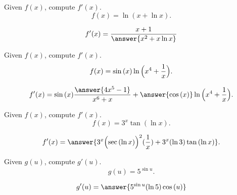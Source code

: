 \documentclass{ximera}
\author{Nela Lakos}
\begin{document}
\begin{exercise}
Given $f(x)$, compute $f'(x)$.
\[
f(x) = \ln{(x+\ln{x})}.
\]
\begin{prompt}
\[
f'(x) =\dfrac{x+1}{ \answer{x^2 +x\ln{x}}}
\]
\end{prompt}
\end{exercise}
\begin{exercise}
Given $f(x)$, compute $f'(x)$.
\[
f(x) = \sin{(x)}\ln{\Bigl(x^4+\frac{1}{x}\Bigr)}.
\]
\begin{prompt}
\[
f'(x) = \sin{(x)}\dfrac{\answer{4x^5-1}}{{x^6+x}}+\answer{ \cos{(x)}}\ln{\Bigl(x^4+\frac{1}{x}\Bigr)}.
\]
\end{prompt}
\end{exercise}
\begin{exercise}
Given $f(x)$, compute $f'(x)$.
\[
f(x) = 3^{x}\tan{(\ln{x})}.
\]
\begin{prompt}
\[
f'(x) =\answer{3^{x}\Bigl(\sec{(\ln{x})}\Bigr)^{2}(\dfrac{1}{x})+3^{x}(\ln{3})\tan{(\ln{x})}}.
\]
\end{prompt}
\end{exercise}

\begin{exercise}
Given $g(u)$, compute $g'(u)$.
\[
g(u) =5^{\sin{u}}.
\]
\begin{prompt}
\[
g'(u) =\answer{ 5^{\sin{u}}(\ln{5})\cos{(u)}}
\]
\end{prompt}
\end{exercise}
\end{document}
